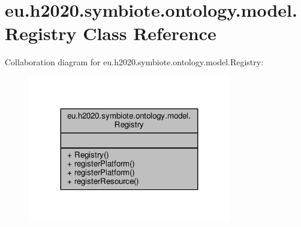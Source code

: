 \hypertarget{classeu_1_1h2020_1_1symbiote_1_1ontology_1_1model_1_1Registry}{}\section{eu.\+h2020.\+symbiote.\+ontology.\+model.\+Registry Class Reference}
\label{classeu_1_1h2020_1_1symbiote_1_1ontology_1_1model_1_1Registry}


Collaboration diagram for eu.\+h2020.\+symbiote.\+ontology.\+model.\+Registry\+:
\nopagebreak
\begin{figure}[H]
\begin{center}
\leavevmode
\includegraphics[width=251pt]{classeu_1_1h2020_1_1symbiote_1_1ontology_1_1model_1_1Registry__coll__graph}
\end{center}
\end{figure}

